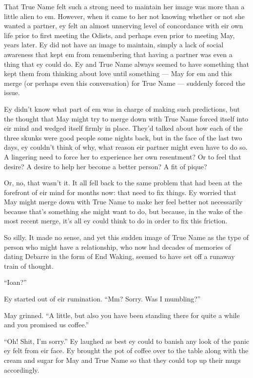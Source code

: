 That True Name felt such a strong need to maintain her image was more than a little alien to em. However, when it came to her not knowing whether or not she wanted a partner, ey felt an almost unnerving level of concordance with eir own life prior to first meeting the Odists, and perhaps even prior to meeting May, years later. Ey did not have an image to maintain, simply a lack of social awareness that kept em from remembering that having a partner was even a thing that ey could do. Ey and True Name always seemed to have something that kept them from thinking about love until something — May for em and this merge (or perhaps even this conversation) for True Name — suddenly forced the issue.

Ey didn't know what part of em was in charge of making such predictions, but the thought that May might try to merge down with True Name forced itself into eir mind and wedged itself firmly in place. They'd talked about how each of the three skunks were good people some nights back, but in the face of the last two days, ey couldn't think of why, what reason eir partner might even have to do so. A lingering need to force her to experience her own resentment? Or to feel that desire? A desire to help her become a better person? A fit of pique?

Or, no, that wasn't it. It all fell back to the same problem that had been at the forefront of eir mind for months now: that need to fix things. Ey worried that May might merge down with True Name to make her feel better not necessarily because that's something she might want to do, but because, in the wake of the most recent merge, it's all ey could think to do in order to fix this friction.

So silly. It made no sense, and yet this sudden image of True Name as the type of person who might have a relationship, who now had decades of memories of dating Debarre in the form of End Waking, seemed to have set off a runaway train of thought.

``Ioan?''

Ey started out of eir rumination. ``Mm? Sorry. Was I mumbling?''

May grinned. ``A little, but also you have been standing there for quite a while and you promised us coffee.''

``Oh! Shit, I'm sorry.'' Ey laughed as best ey could to banish any look of the panic ey felt from eir face. Ey brought the pot of coffee over to the table along with the cream and sugar for May and True Name so that they could top up their mugs accordingly.


